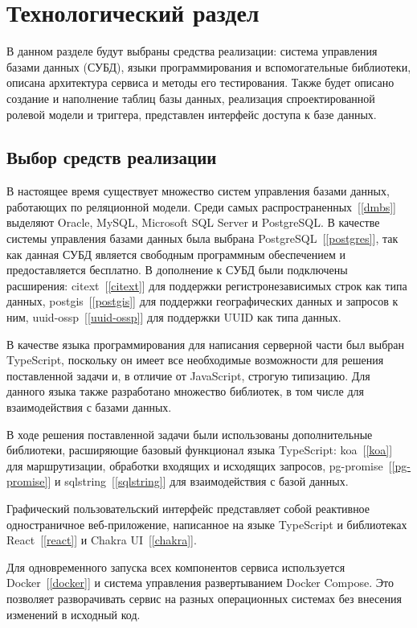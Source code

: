 \chapter{Технологический раздел}

В данном разделе будут выбраны средства реализации: система управления базами данных (СУБД), языки программирования и вспомогательные библиотеки, описана архитектура сервиса и методы его тестирования. Также будет описано создание и наполнение таблиц базы данных, реализация спроектированной ролевой модели и триггера, представлен интерфейс доступа к базе данных.

\section{Выбор средств реализации}

В настоящее время существует множество систем управления базами данных, работающих по реляционной модели. Среди самых распространенных~[\ref{dmbs}] выделяют Oracle, MySQL, Microsoft SQL Server и PostgreSQL. В качестве системы управления базами данных была выбрана PostgreSQL~[\ref{postgres}], так как данная СУБД является свободным программным обеспечением и предоставляется бесплатно. В дополнение к СУБД были подключены расширения: citext~[\ref{citext}] для поддержки регистронезависимых строк как типа данных, postgis~[\ref{postgis}] для поддержки географических данных и запросов к ним, uuid-ossp~[\ref{uuid-ossp}] для поддержки UUID как типа данных.

В качестве языка программирования для написания серверной части был выбран TypeScript, поскольку он имеет все необходимые возможности для решения поставленной задачи и, в отличие от JavaScript, строгую типизацию. Для данного языка также разработано множество библиотек, в том числе для взаимодействия с базами данных.

В ходе решения поставленной задачи были использованы дополнительные библиотеки, расширяющие базовый функционал языка TypeScript: koa~[\ref{koa}] для маршрутизации, обработки входящих и исходящих запросов, pg-promise~[\ref{pg-promise}] и sqlstring~[\ref{sqlstring}] для взаимодействия с базой данных.

Графический пользовательский интерфейс представляет собой реактивное одностраничное веб-приложение, написанное на языке TypeScript и библиотеках React~[\ref{react}] и Chakra UI~[\ref{chakra}].

Для одновременного запуска всех компонентов сервиса используется Docker~[\ref{docker}] и система управления развертыванием Docker Compose. Это позволяет разворачивать сервис на разных операционных системах без внесения изменений в исходный код.

